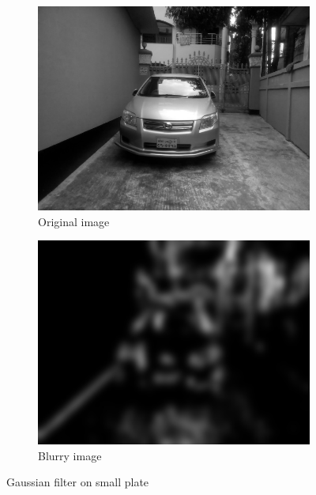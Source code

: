 \begin{figure}
\begin{subfigure}{0.5\textwidth}
    \centering
    \includegraphics[width=0.9\linewidth]{./img/experiment/stage.2/small}
    \caption{Original image}
\end{subfigure}
\begin{subfigure}{0.5\textwidth}
    \centering
    \includegraphics[width=0.9\linewidth]{./img/experiment/stage.4/small}
    \caption{Blurry image}
\end{subfigure}
\caption{Gaussian filter on small plate}
\label{fig:GaussianResult3}
\end{figure}
